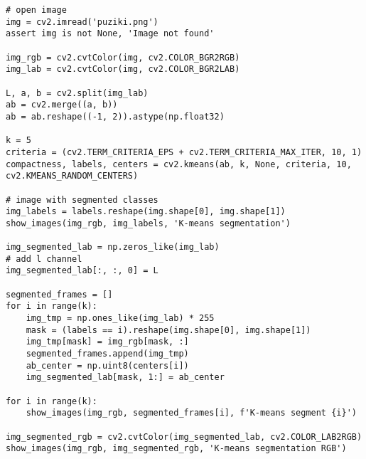 \begin{lstlisting}[caption={caption text}, label={lst:}]
# open image
img = cv2.imread('puziki.png')
assert img is not None, 'Image not found'

img_rgb = cv2.cvtColor(img, cv2.COLOR_BGR2RGB)
img_lab = cv2.cvtColor(img, cv2.COLOR_BGR2LAB)

L, a, b = cv2.split(img_lab)
ab = cv2.merge((a, b))
ab = ab.reshape((-1, 2)).astype(np.float32)

k = 5
criteria = (cv2.TERM_CRITERIA_EPS + cv2.TERM_CRITERIA_MAX_ITER, 10, 1)
compactness, labels, centers = cv2.kmeans(ab, k, None, criteria, 10, cv2.KMEANS_RANDOM_CENTERS)

# image with segmented classes 
img_labels = labels.reshape(img.shape[0], img.shape[1])
show_images(img_rgb, img_labels, 'K-means segmentation')

img_segmented_lab = np.zeros_like(img_lab)
# add l channel
img_segmented_lab[:, :, 0] = L

segmented_frames = []
for i in range(k):
    img_tmp = np.ones_like(img_lab) * 255
    mask = (labels == i).reshape(img.shape[0], img.shape[1])
    img_tmp[mask] = img_rgb[mask, :]
    segmented_frames.append(img_tmp)
    ab_center = np.uint8(centers[i])
    img_segmented_lab[mask, 1:] = ab_center

for i in range(k):
    show_images(img_rgb, segmented_frames[i], f'K-means segment {i}')

img_segmented_rgb = cv2.cvtColor(img_segmented_lab, cv2.COLOR_LAB2RGB)
show_images(img_rgb, img_segmented_rgb, 'K-means segmentation RGB')
\end{lstlisting}

